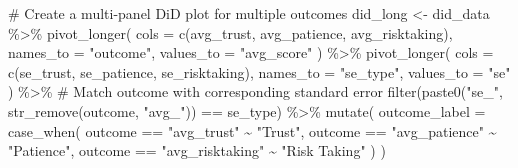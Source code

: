 \documentclass[
  letterpaper,
  DIV=11,
  numbers=noendperiod]{scrartcl}
\newenvironment{Shaded}{\begin{snugshade}}{\end{snugshade}}
\newcommand{\AttributeTok}[1]{\textcolor[rgb]{0.40,0.45,0.13}{#1}}
\newcommand{\CommentTok}[1]{\textcolor[rgb]{0.37,0.37,0.37}{#1}}
\newcommand{\FunctionTok}[1]{\textcolor[rgb]{0.28,0.35,0.67}{#1}}
\newcommand{\NormalTok}[1]{\textcolor[rgb]{0.00,0.23,0.31}{#1}}
\newcommand{\OtherTok}[1]{\textcolor[rgb]{0.00,0.23,0.31}{#1}}
\newcommand{\SpecialCharTok}[1]{\textcolor[rgb]{0.37,0.37,0.37}{#1}}
\newcommand{\StringTok}[1]{\textcolor[rgb]{0.13,0.47,0.30}{#1}}
\begin{document}
\begin{Shaded}
\begin{Highlighting}[]
\CommentTok{\# Create a multi{-}panel DiD plot for multiple outcomes}
\NormalTok{did\_long }\OtherTok{\textless{}{-}}\NormalTok{ did\_data }\SpecialCharTok{\%\textgreater{}\%}
  \FunctionTok{pivot\_longer}\NormalTok{(}
    \AttributeTok{cols =} \FunctionTok{c}\NormalTok{(avg\_trust, avg\_patience, avg\_risktaking),}
    \AttributeTok{names\_to =} \StringTok{"outcome"}\NormalTok{,}
    \AttributeTok{values\_to =} \StringTok{"avg\_score"}
\NormalTok{  ) }\SpecialCharTok{\%\textgreater{}\%}
  \FunctionTok{pivot\_longer}\NormalTok{(}
    \AttributeTok{cols =} \FunctionTok{c}\NormalTok{(se\_trust, se\_patience, se\_risktaking),}
    \AttributeTok{names\_to =} \StringTok{"se\_type"}\NormalTok{,}
    \AttributeTok{values\_to =} \StringTok{"se"}
\NormalTok{  ) }\SpecialCharTok{\%\textgreater{}\%}
  \CommentTok{\# Match outcome with corresponding standard error}
  \FunctionTok{filter}\NormalTok{(}\FunctionTok{paste0}\NormalTok{(}\StringTok{"se\_"}\NormalTok{, }\FunctionTok{str\_remove}\NormalTok{(outcome, }\StringTok{"avg\_"}\NormalTok{)) }\SpecialCharTok{==}\NormalTok{ se\_type) }\SpecialCharTok{\%\textgreater{}\%}
  \FunctionTok{mutate}\NormalTok{(}
    \AttributeTok{outcome\_label =} \FunctionTok{case\_when}\NormalTok{(}
\NormalTok{      outcome }\SpecialCharTok{==} \StringTok{"avg\_trust"} \SpecialCharTok{\textasciitilde{}} \StringTok{"Trust"}\NormalTok{,}
\NormalTok{      outcome }\SpecialCharTok{==} \StringTok{"avg\_patience"} \SpecialCharTok{\textasciitilde{}} \StringTok{"Patience"}\NormalTok{,}
\NormalTok{      outcome }\SpecialCharTok{==} \StringTok{"avg\_risktaking"} \SpecialCharTok{\textasciitilde{}} \StringTok{"Risk Taking"}
\NormalTok{    )}
\NormalTok{  )}


\end{Highlighting}
\end{Shaded}
\end{document}
